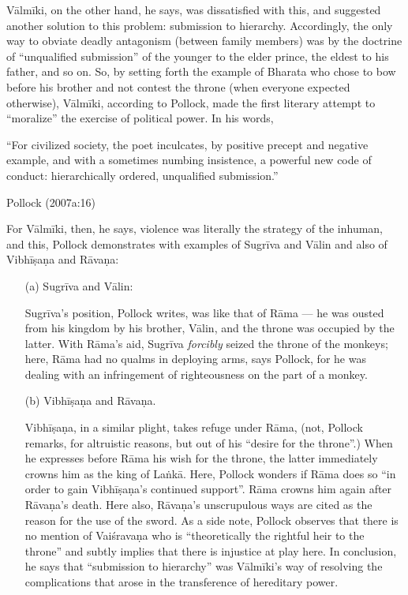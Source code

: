 Vālmīki, on the other hand, he says, was dissatisfied with this, and suggested another solution to this problem: submission to hierarchy. Accordingly, the only way to obviate deadly antagonism (between family members) was by the doctrine of “unqualified submission” of the younger to the elder prince, the eldest to his father, and so on. So, by setting forth the example of Bharata who chose to bow before his brother and not contest the throne (when everyone expected otherwise), Vālmīki, according to Pollock, made the first literary attempt to “moralize” the exercise of political power. In his words,

\begin{myquote}
“For civilized society, the poet inculcates, by positive precept and negative example, and with a sometimes numbing insistence, a powerful new code of conduct: hierarchically ordered, unqualified submission.''

\hfill Pollock (2007a:16)
\end{myquote}

For Vālmīki, then, he says, violence was literally the strategy of the inhuman, and this, Pollock demonstrates with examples of Sugrīva and Vālin and also of Vibhīṣaṇa and Rāvaṇa: 
\begin{itemize}
\item[(a)] Sugrīva and Vālin:

Sugrīva’s position, Pollock writes, was like that of Rāma --- he was ousted from his kingdom by his brother, Vālin, and the throne was occupied by the latter. With Rāma’s aid, Sugrīva {\sl forcibly} seized the throne of the monkeys; here, Rāma had no qualms in deploying arms, says Pollock, for he was dealing with an infringement of righteousness on the part of a monkey. 

\newpage

\item[(b)] Vibhīṣaṇa and Rāvaṇa. 

Vibhīṣaṇa, in a similar plight, takes refuge under Rāma, (not, Pollock remarks, for altruistic reasons, but out of his “desire for the throne”.) When he expresses before Rāma his wish for the throne, the latter immediately crowns him as the king of Laṅkā. Here, Pollock wonders if Rāma does so “in order to gain Vibhīṣaṇa’s continued support”. Rāma crowns him again after Rāvaṇa’s death. Here also, Rāvaṇa’s unscrupulous ways are cited as the reason for the use of the sword. As a side note, Pollock observes that there is no mention of Vaiśravaṇa who is “theoretically the rightful heir to the throne” and subtly implies that there is injustice at play here. In conclusion, he says that “submission to hierarchy” was Vālmīki’s way of resolving the complications that arose in the transference of hereditary power. 
\end{itemize}

